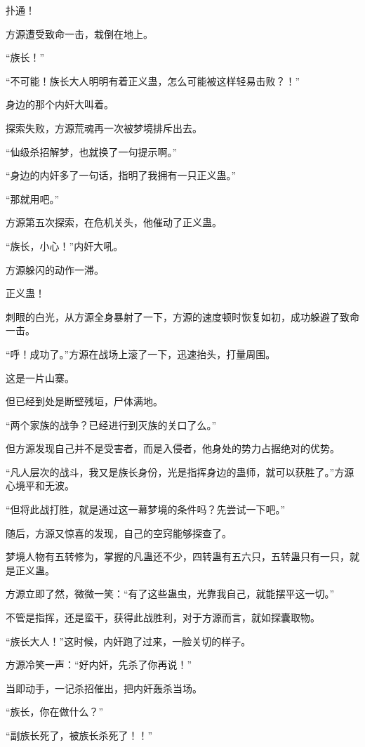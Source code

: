 \begin{this_body}
扑通！

方源遭受致命一击，栽倒在地上。

“族长！”

“不可能！族长大人明明有着正义蛊，怎么可能被这样轻易击败？！”

身边的那个内奸大叫着。

探索失败，方源荒魂再一次被梦境排斥出去。

“仙级杀招解梦，也就换了一句提示啊。”

“身边的内奸多了一句话，指明了我拥有一只正义蛊。”

“那就用吧。”

方源第五次探索，在危机关头，他催动了正义蛊。

“族长，小心！”内奸大吼。

方源躲闪的动作一滞。

正义蛊！

刺眼的白光，从方源全身暴射了一下，方源的速度顿时恢复如初，成功躲避了致命一击。

“呼！成功了。”方源在战场上滚了一下，迅速抬头，打量周围。

这是一片山寨。

但已经到处是断壁残垣，尸体满地。

“两个家族的战争？已经进行到灭族的关口了么。”

但方源发现自己并不是受害者，而是入侵者，他身处的势力占据绝对的优势。

“凡人层次的战斗，我又是族长身份，光是指挥身边的蛊师，就可以获胜了。”方源心境平和无波。

“但将此战打胜，就是通过这一幕梦境的条件吗？先尝试一下吧。”

随后，方源又惊喜的发现，自己的空窍能够探查了。

梦境人物有五转修为，掌握的凡蛊还不少，四转蛊有五六只，五转蛊只有一只，就是正义蛊。

方源立即了然，微微一笑：“有了这些蛊虫，光靠我自己，就能摆平这一切。”

不管是指挥，还是蛮干，获得此战胜利，对于方源而言，就如探囊取物。

“族长大人！”这时候，内奸跑了过来，一脸关切的样子。

方源冷笑一声：“好内奸，先杀了你再说！”

当即动手，一记杀招催出，把内奸轰杀当场。

“族长，你在做什么？”

“副族长死了，被族长杀死了！！”


\end{this_body}
